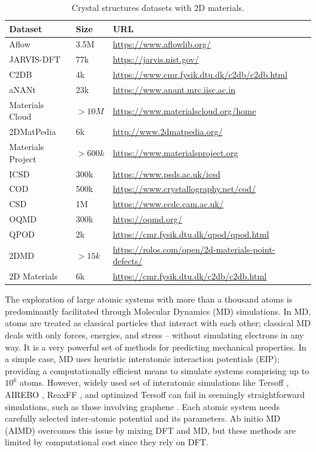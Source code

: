\begin{table}[ht]
    \centering
    \begin{tabular} {l l l l}
        \toprule
        \hline
        Dataset   & Size   & URL  \\
        \hline
        Aflow & 3.5M & \url{https://www.aflowlib.org/} \\
        JARVIS-DFT & 77k & \url{https://jarvis.nist.gov/} \\
        C2DB & 4k & \url{https://www.cmr.fysik.dtu.dk/c2db/c2db.html} \\
        aNANt &23k& \url{https://www.anant.mrc.iisc.ac.in} \\
        Materials Cloud & $>10M$ & \url{https://www.materialscloud.org/home} \\
        2DMatPedia& 6k & \url{http://www.2dmatpedia.org/} \\
        Materials Project & $>600k$&  \url{https://www.materialsproject.org} \\
        ICSD &300k & \url{https://www.psds.ac.uk/icsd} \\
        COD &500k & \url{https://www.crystallography.net/cod/} \\
        CSD & 1M & \url{https://www.ccdc.cam.ac.uk/} \\
        OQMD  &300k& \url{https://oqmd.org/} \\
        QPOD &2k& \url{https://cmr.fysik.dtu.dk/qpod/qpod.html} \\
        2DMD  &$>15k$& \url{https://rolos.com/open/2d-materials-point-defects/} \\
        2D Materials  & 6k &  \url{https://cmr.fysik.dtu.dk/c2db/c2db.html} \\
        \bottomrule
    \end{tabular}
    \caption{Crystal structures datasets with 2D materials.}
    \label{table:Table2}
\end{table}

The exploration of large atomic systems with more than a thousand atoms is predominantly facilitated through Molecular Dynamics (MD) simulations. In MD, atoms are treated as classical particles that interact with each other; classical MD deals with only forces, energies, and stress -- without simulating electrons in any way. It is a very powerful set of methods for predicting mechanical properties. In a simple case, MD uses heuristic interatomic interaction potentials (EIP); providing a computationally efficient means to simulate systems comprising up to $10^{6}$ atoms. However, widely used set of interatomic simulations like Tersoff \cite{tersoff1989modeling}, AIREBO \cite{stuart2000reactive}, ReaxFF \cite{srinivasan2015development}, and optimized Tersoff \cite{lindsay2010optimized} can fail in seemingly straightforward simulations, such as those involving graphene \cite{mortazavi2021first}. Each atomic system needs carefully selected inter-atomic potential and its parameters. Ab initio MD (AIMD) overcomes this issue by mixing DFT and MD, but these methods are limited by computational cost since they rely on DFT.
 
